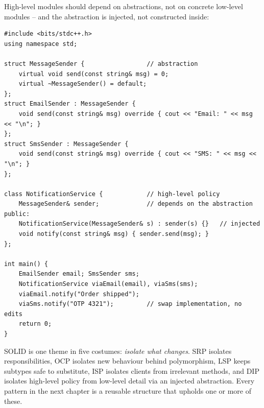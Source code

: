 High-level modules should depend on abstractions, not on concrete
low-level modules -- and the abstraction is injected, not constructed
inside:

\begin{lstlisting}
#include <bits/stdc++.h>
using namespace std;

struct MessageSender {                 // abstraction
    virtual void send(const string& msg) = 0;
    virtual ~MessageSender() = default;
};
struct EmailSender : MessageSender {
    void send(const string& msg) override { cout << "Email: " << msg << "\n"; }
};
struct SmsSender : MessageSender {
    void send(const string& msg) override { cout << "SMS: " << msg << "\n"; }
};

class NotificationService {            // high-level policy
    MessageSender& sender;             // depends on the abstraction
public:
    NotificationService(MessageSender& s) : sender(s) {}   // injected
    void notify(const string& msg) { sender.send(msg); }
};

int main() {
    EmailSender email; SmsSender sms;
    NotificationService viaEmail(email), viaSms(sms);
    viaEmail.notify("Order shipped");
    viaSms.notify("OTP 4321");         // swap implementation, no edits
    return 0;
}
\end{lstlisting}

\begin{takeawaybox}
SOLID is one theme in five costumes: \emph{isolate what changes}. SRP
isolates responsibilities, OCP isolates new behaviour behind polymorphism,
LSP keeps subtypes safe to substitute, ISP isolates clients from
irrelevant methods, and DIP isolates high-level policy from low-level
detail via an injected abstraction. Every pattern in the next chapter is a
reusable structure that upholds one or more of these.
\end{takeawaybox}
